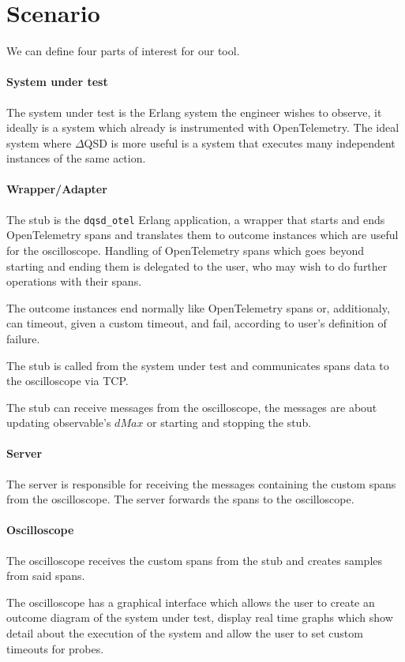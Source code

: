 \section{Scenario}
    We can define four parts of interest for our tool.
    \paragraph{System under test} The system under test is the Erlang system the engineer wishes to observe, it ideally is a system which already is instrumented with OpenTelemetry. The ideal system where $\Delta$QSD is more useful is a system that executes many independent instances of the same action.
    
    \paragraph{Wrapper/Adapter} The stub is the \texttt{dqsd\_otel} Erlang application, a wrapper that starts and ends OpenTelemetry spans and translates them to outcome instances which are useful for the oscilloscope. Handling of OpenTelemetry spans which goes beyond starting and ending them is delegated to the user, who may wish to do further operations with their spans. 
   
    The outcome instances end normally like OpenTelemetry spans or, additionaly, can timeout, given a custom timeout, and fail, according to user's definition of failure. 
    
    The stub is called from the system under test and communicates spans data to the oscilloscope via TCP. 
    
    The stub can receive messages from the oscilloscope, the messages are about updating observable's $dMax$ or starting and stopping the stub.
    
    \paragraph{Server} The server is responsible for receiving the messages containing the custom spans from the oscilloscope. The server forwards the spans to the oscilloscope.
    
    \paragraph{Oscilloscope} The oscilloscope receives the custom spans from the stub and creates samples from said spans. 
    
    The oscilloscope has a graphical interface which allows the user to create an outcome diagram of the system under test, display real time graphs which show detail about the execution of the system and allow the user to set custom timeouts for probes.

